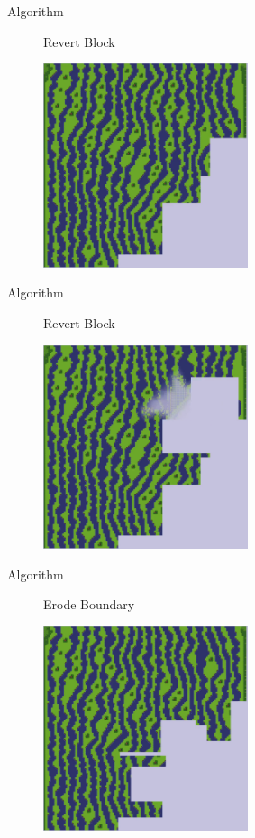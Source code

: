 \documentclass{beamer}
\begin{document}
  \begin{frame}[fragile]{Algorithm}
    \begin{figure}
      Revert Block

      \includegraphics[width=6cm]{img/fm_0023.pdf}
    \end{figure}
  \end{frame}

  \begin{frame}[fragile]{Algorithm}
    \begin{figure}
      Revert Block

      \includegraphics[width=6cm]{img/fm_0024.pdf}
    \end{figure}
  \end{frame}

  \begin{frame}[fragile]{Algorithm}

    \begin{figure}
      Erode Boundary

      \includegraphics[width=6cm]{img/fm_0035.pdf}
    \end{figure}
  \end{frame}
\end{document}
